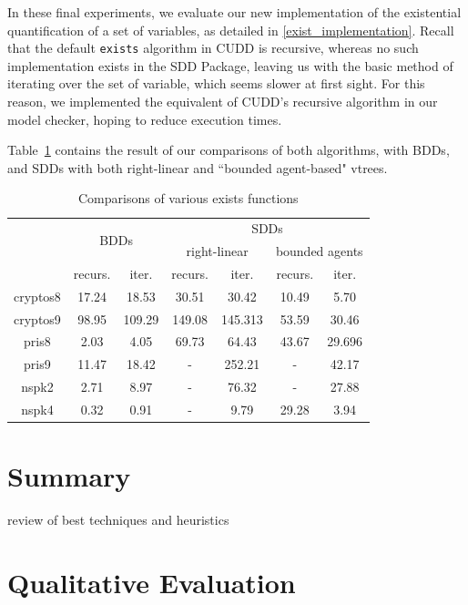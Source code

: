 \documentclass[11pt]{report}
\begin{document}
In these final experiments, we evaluate our new implementation of the existential quantification of a set of variables, as detailed in \ref{exist_implementation}. Recall that the default \texttt{exists} algorithm in CUDD is recursive, whereas no such implementation exists in the SDD Package, leaving us with the basic method of iterating over the set of variable, which seems slower at first sight. For this reason, we implemented the equivalent of CUDD's recursive algorithm in our model checker, hoping to reduce execution times. 

Table~\ref{table:existcomparisons} contains the result of our comparisons of both algorithms, with BDDs, and SDDs with both right-linear and ``bounded agent-based" vtrees.


\begin{table}
\centering
\begin{tabular}{|*{7}{c|}}
\hline
 &\multicolumn{2}{c|}{\multirow{2}{*}{BDDs}} & \multicolumn{4}{c|}{SDDs}  \\ \cline{4-7}
 & \multicolumn{2}{c|}{}& \multicolumn{2}{c|}{right-linear}& \multicolumn{2}{c|}{bounded agents}\\ \hline
 & recurs. & iter. & recurs. & iter. & recurs. & iter. \\ \hline 
cryptos8 &17.24 & 18.53 & 30.51 & 30.42 & 10.49 & 5.70\\ \hline
cryptos9 & 98.95  & 109.29 & 149.08 & 145.313 & 53.59 & 30.46\\ \hline
pris8 & 2.03 & 4.05  & 69.73&64.43  &43.67 & 29.696 \\ \hline
pris9 & 11.47& 18.42 & - & 252.21 & -& 42.17 \\ \hline
nspk2 & 2.71 & 8.97 & - & 76.32 & -& 27.88\\ \hline
nspk4 & 0.32 & 0.91 & - & 9.79 & 29.28 & 3.94 \\ \hline
\end{tabular}
\caption{Comparisons of various exists functions}
\label{table:existcomparisons}
\end{table}

\section{Summary}

review of best techniques and heuristics

\section{Qualitative Evaluation}
\end{document}
